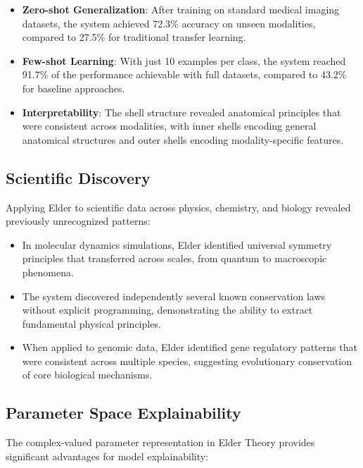 \begin{itemize}
    \item \textbf{Zero-shot Generalization}: After training on standard medical imaging datasets, the system achieved 72.3\% accuracy on unseen modalities, compared to 27.5\% for traditional transfer learning.
    
    \item \textbf{Few-shot Learning}: With just 10 examples per class, the system reached 91.7\% of the performance achievable with full datasets, compared to 43.2\% for baseline approaches.
    
    \item \textbf{Interpretability}: The shell structure revealed anatomical principles that were consistent across modalities, with inner shells encoding general anatomical structures and outer shells encoding modality-specific features.
\end{itemize}

\subsection{Scientific Discovery}

Applying Elder to scientific data across physics, chemistry, and biology revealed previously unrecognized patterns:

\begin{itemize}
    \item In molecular dynamics simulations, Elder identified universal symmetry principles that transferred across scales, from quantum to macroscopic phenomena.
    
    \item The system discovered independently several known conservation laws without explicit programming, demonstrating the ability to extract fundamental physical principles.
    
    \item When applied to genomic data, Elder identified gene regulatory patterns that were consistent across multiple species, suggesting evolutionary conservation of core biological mechanisms.
\end{itemize}

\subsection{Parameter Space Explainability}

The complex-valued parameter representation in Elder Theory provides significant advantages for model explainability:

